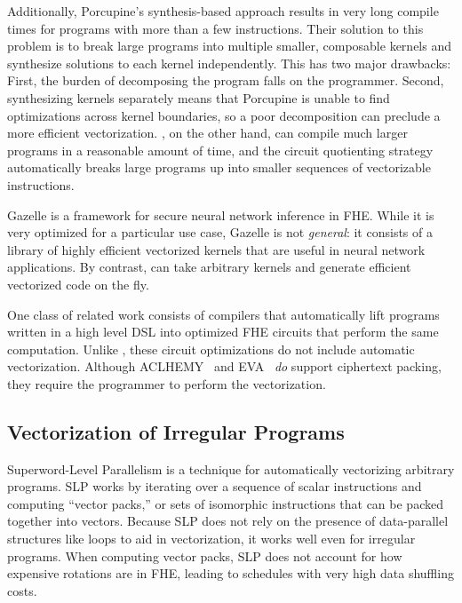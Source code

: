 Additionally, Porcupine's synthesis-based approach results in very long compile times for programs with more than a few instructions.
Their solution to this problem is to break large programs into multiple smaller, composable kernels and synthesize solutions to each kernel independently.
This has two major drawbacks: First, the burden of decomposing the program falls on the programmer. Second, synthesizing kernels separately means that Porcupine is unable to find optimizations across kernel boundaries, so a poor decomposition can preclude a more efficient vectorization.
\system, on the other hand, can compile much larger programs in a reasonable amount of time, and the circuit quotienting strategy automatically breaks large programs up into smaller sequences of vectorizable instructions. %


Gazelle \cite{Gazelle} is a framework for secure neural network inference in FHE.
While it is very optimized for a particular use case, Gazelle is not {\em general}: it consists of a library of highly efficient vectorized kernels that are useful in neural network applications.
By contrast, \system can take arbitrary kernels and generate efficient vectorized code on the fly. %

One class of related work consists of compilers \cite{Ramparts, ALCHEMY, EVA, Cingulata} that automatically lift programs written in a high level DSL into optimized FHE circuits that perform the same computation.
Unlike \system, these circuit optimizations do not include automatic vectorization. Although ACLHEMY~\cite{ALCHEMY} and EVA~\cite{EVA} \textit{do} support ciphertext packing, they require the programmer to perform the vectorization.

\subsection{Vectorization of Irregular Programs}
Superword-Level Parallelism \cite{SLP} is a technique for automatically vectorizing arbitrary programs.
SLP works by iterating over a sequence of scalar instructions and computing ``vector packs,'' or sets of isomorphic instructions that can be packed together into vectors.
Because SLP does not rely on the presence of data-parallel structures like loops to aid in vectorization, it works well even for irregular programs.
When computing vector packs, SLP does not account for how expensive rotations are in FHE, leading to schedules with very high data shuffling costs. 

